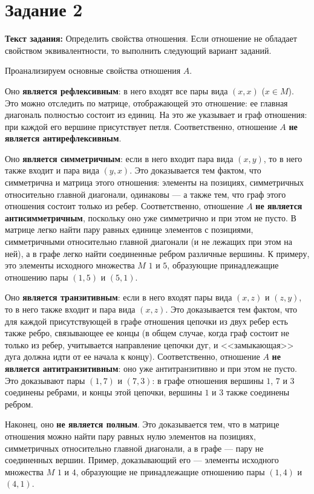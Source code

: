 \documentclass[12pt]{article}
\begin{document}
	\section{Задание 2}
	\label{task2}
	
	{\bf Текст задания:} Определить свойства отношения. Если отношение не обладает свойством эквивалентности, то выполнить следующий вариант заданий. 
	
	Проанализируем основные свойства отношения $A$. 
	
	Оно {\bf является рефлексивным}: в него входят все пары вида $(x, x)$ ($x \in M$). Это можно отследить по матрице, отображающей это отношение: ее главная диагональ полностью состоит из единиц. На это же указывает и граф отношения: при каждой его вершине присутствует петля. Соответственно, отношение $A$ {\bf не является антирефлексивным}.
	
	Оно {\bf является симметричным}: если в него входит пара вида $(x, y)$, то в него также входит и пара вида $(y, x)$. Это доказывается  тем фактом, что симметрична и матрица этого отношения: элементы на позициях, симметричных относительно главной диагонали, одинаковы --- а также тем, что граф этого отношения состоит только из ребер. Соответственно, отношение $A$ {\bf не является антисимметричным}, поскольку оно уже симметрично и при этом не пусто. В матрице легко найти пару равных единице элементов с позициями, симметричными относительно главной диагонали (и не лежащих при этом на ней), а в графе легко найти соединенные ребром различные вершины. К примеру, это элементы исходного множества $M$ $1$ и $5$, образующие принадлежащие отношению пары $(1, 5)$ и $(5, 1)$.
	
	Оно {\bf является транзитивным}: если в него входят пары вида $(x, z)$ и $(z, y)$, то в него также входит и пара вида $(x, z)$. Это доказывается тем фактом, что для каждой присутствующей в графе отношения цепочки из двух ребер есть также ребро, связывающее ее концы (в общем случае, когда граф состоит не только из ребер, учитывается направление цепочки дуг, и <<замыкающая>> дуга должна идти от ее начала к концу). Соответственно, отношение $A$ {\bf не является антитранзитивным}: оно уже антитранзитивно и при этом не пусто. Это доказывают пары $(1, 7)$ и $(7, 3)$: в графе отношения вершины $1$, $7$ и $3$ соединены ребрами, и концы этой цепочки, вершины $1$ и $3$ также соединены ребром. 
	
	Наконец, оно {\bf не является полным}. Это доказывается тем, что в матрице отношения можно найти пару равных нулю элементов на позициях, симметричных относительно главной диагонали, а в графе --- пару не соединенных вершин. Пример, доказывающий его --- элементы исходного множества $M$ $1$ и $4$, образующие не принадлежащие отношению пары $(1, 4)$ и $(4, 1)$.
	
\end{document}
